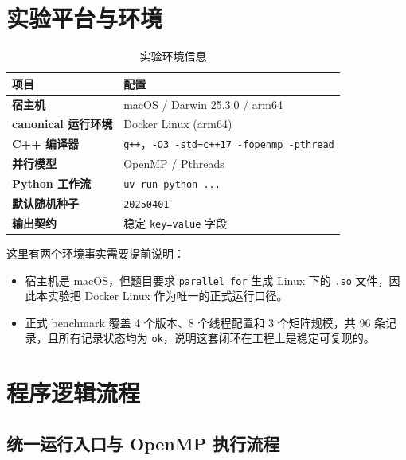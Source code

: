 \documentclass[UTF8,a4paper,12pt,fontset=none]{ctexart}
\begin{document}
\section{实验平台与环境}

\begin{table}[H]
  \centering
  \caption{实验环境信息}
  \renewcommand{\arraystretch}{1.2}
  \begin{tabularx}{0.92\textwidth}{>{\bfseries}p{4cm}X}
    \toprule
    项目 & 配置 \\
    \midrule
    宿主机 & macOS / Darwin 25.3.0 / arm64 \\
    canonical 运行环境 & Docker Linux (arm64) \\
    C++ 编译器 & \texttt{g++}，\texttt{-O3 -std=c++17 -fopenmp -pthread} \\
    并行模型 & OpenMP / Pthreads \\
    Python 工作流 & \texttt{uv run python ...} \\
    默认随机种子 & \texttt{20250401} \\
    输出契约 & 稳定 \texttt{key=value} 字段 \\
    \bottomrule
  \end{tabularx}
\end{table}

这里有两个环境事实需要提前说明：
\begin{itemize}[leftmargin=2.2em]
  \item 宿主机是 macOS，但题目要求 \texttt{parallel\_for} 生成 Linux 下的 \texttt{.so} 文件，因此本实验把 Docker Linux 作为唯一的正式运行口径。
  \item 正式 benchmark 覆盖 4 个版本、8 个线程配置和 3 个矩阵规模，共 96 条记录，且所有记录状态均为 \texttt{ok}，说明这套闭环在工程上是稳定可复现的。
\end{itemize}

\section{程序逻辑流程}

\subsection{统一运行入口与 OpenMP 执行流程}
\end{document}
